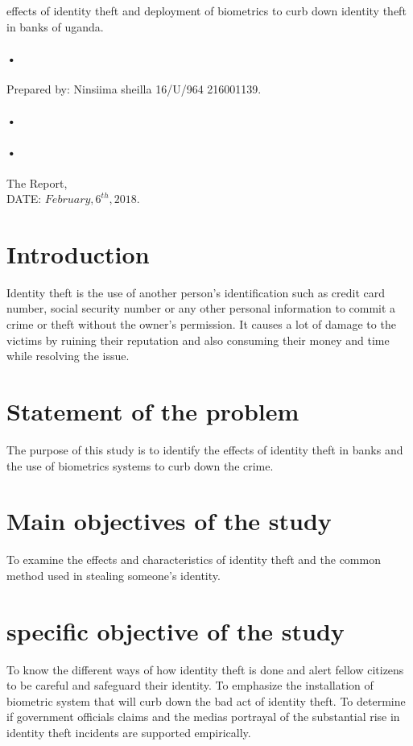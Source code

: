 \documentclass[12pt,]{article}
\begin{document}
\begin{titlepage}
\centerline{effects of identity theft and deployment of biometrics to curb down identity theft in banks of uganda.\\}
\paragraph*{•}
\centerline{  Prepared by:  Ninsiima sheilla 16/U/964 216001139.\\}
\paragraph*{•}
\paragraph*{•}
  \begin{flushright}
  The Report,\\
  DATE: $February,6^{th},2018$.
  

  \end{flushright}
\date{\today}
\end{titlepage}

\newpage
\tableofcontents
\newpage


\section{Introduction}
Identity theft is the use of another person’s identification such as credit card number, social security number or any other personal information to commit a crime or theft without the owner’s permission.
It causes a lot of damage to the victims by ruining their reputation and also consuming their money and time while resolving the issue.

\section{Statement of the problem}
The purpose of this study is to identify the effects of identity theft in banks and the use of biometrics systems to curb down the crime.

\section{Main objectives of the study}
To examine the effects and characteristics of identity theft and the common method used in stealing someone’s identity.
\section{specific objective of the study}
To know the different ways of how identity theft is done and alert fellow citizens to be careful and safeguard their identity.
To emphasize the installation of biometric system that will curb down the bad act of identity theft.
To determine if government officials claims and the medias portrayal of the substantial rise in identity theft incidents are supported empirically.
\end{document}
